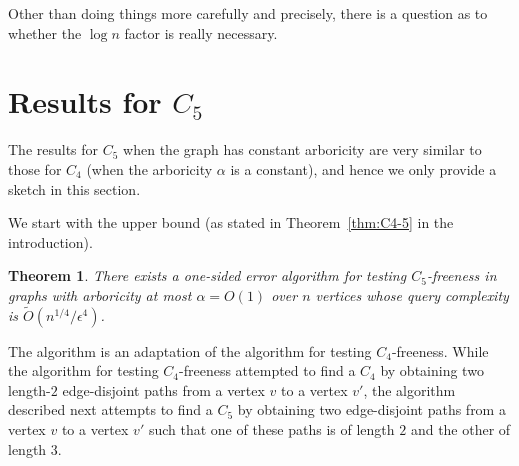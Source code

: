 \documentclass{article}
\newcommand{\eps}{\epsilon}
\newtheorem{theorem}{Theorem}
\newcommand{\commentt}[1]{ {}}
\begin{document}
Other than doing things more carefully and precisely, there is a question as to whether the $\log n$ factor is really necessary.
\fi



%


\section{Results for $C_5$}\label{sec:C5}

The results for $C_5$ when the graph has constant arboricity are very similar to those for $C_4$ (when the arboricity $\alpha$ is a constant), and hence we only provide a sketch in this section.

We start with the upper bound (as stated in Theorem~\ref{thm:C4-5} in the introduction).
\begin{theorem}\label{thm:C5-ub}
There exists a one-sided error algorithm for testing $C_5$-freeness in graphs with  arboricity at most $\alpha = O(1)$ over $n$ vertices whose query complexity is $\widetilde{O}(n^{1/4}/\eps^{4})$. 
\end{theorem}

The algorithm is an adaptation of the algorithm for testing $C_4$-freeness.
 While the algorithm for testing $C_4$-freeness attempted to find a $C_4$ by obtaining two length-$2$ edge-disjoint paths from a vertex $v$ to a vertex $v'$, the algorithm described next
 attempts to find a $C_5$ by obtaining two edge-disjoint paths from a vertex $v$ to a vertex $v'$ such that one of these paths is of length $2$ and the other of length $3$.
\end{document}
